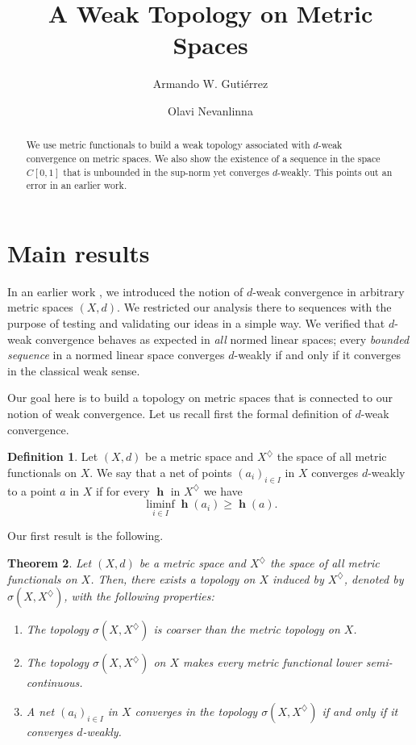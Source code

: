 \documentclass[11pt]{amsart}
\newtheorem{theorem}{Theorem}[section]
\theoremstyle{definition}
\newtheorem{definition}[theorem]{Definition}
\numberwithin{equation}{section}
\DeclareMathOperator{\h}{\mathbf{h}} %
\numberwithin{equation}{section}
\begin{document}
\title{A Weak Topology on Metric Spaces}
\begin{abstract}
We use metric functionals to build a weak topology associated 
with $d$-weak convergence on metric spaces. We also show the
existence of a sequence in the space $C[0,1]$ that is unbounded 
in the sup-norm yet converges $d$-weakly. 
This points out an error in an earlier work.
\end{abstract}
\author{Armando W. Gutiérrez}
\author{Olavi Nevanlinna}

\date{}

\maketitle

\section{Main results}

In an earlier work \cite{GNweakconv}, we introduced the notion 
of $d$-weak convergence in arbitrary metric spaces $(X,d)$. We 
restricted our analysis there to sequences with the purpose of
testing and validating our ideas in a simple way. We verified that
$d$-weak convergence behaves as expected in \emph{all} normed 
linear spaces; every \emph{bounded sequence} in a normed linear space 
converges $d$-weakly if and only if it converges in the classical 
weak sense.

Our goal here is to build a topology on metric spaces 
that is connected to our notion of weak convergence. Let us 
recall first the formal definition of $d$-weak convergence. 

\begin{definition}
Let $(X,d)$ be a metric space and $X^\diamondsuit$ the space of 
all metric functionals on $X$. We say that a net of points 
$(a_i)_{i\in I}$ in $X$ converges $d$-weakly to a point $a$ in $X$ 
if for every $\h$ in $X^\diamondsuit$ we have 
$$
    \liminf_{i\in I}\h(a_i) \geq \h(a).
$$
\end{definition}

Our first result is the following. 

\begin{theorem}\label{thm:thm1}
Let $(X,d)$ be a metric space and $X^\diamondsuit$ the space of 
all metric functionals on $X$. Then, there exists a topology on $X$ 
induced by $X^\diamondsuit$, denoted by $\sigma(X,X^\diamondsuit)$,
with the following properties:
\begin{enumerate}
    \item The topology $\sigma(X,X^\diamondsuit)$ is coarser 
    than the metric topology on $X$.
    \item The topology $\sigma(X,X^\diamondsuit)$ on $X$ makes 
    every metric functional lower semi-continuous.
    \item A net $(a_i)_{i\in I}$ in $X$ converges in the 
    topology $\sigma(X,X^\diamondsuit)$ if and only if it 
    converges $d$-weakly.
\end{enumerate}
\end{theorem}
\end{document}
